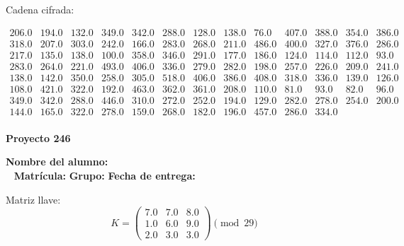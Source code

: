 \documentclass[12pt]{article}
\begin{document}
Cadena cifrada:
\begin{center}
$\begin{array}{lllllllllllll}
206.0 & 194.0 & 132.0 & 349.0 & 342.0 & 288.0 & 128.0 & 138.0 & 76.0 & 407.0 & 388.0 & 354.0 & 386.0\\
318.0 & 207.0 & 303.0 & 242.0 & 166.0 & 283.0 & 268.0 & 211.0 & 486.0 & 400.0 & 327.0 & 376.0 & 286.0\\
217.0 & 135.0 & 138.0 & 100.0 & 358.0 & 346.0 & 291.0 & 177.0 & 186.0 & 124.0 & 114.0 & 112.0 & 93.0\\
283.0 & 264.0 & 221.0 & 493.0 & 406.0 & 336.0 & 279.0 & 282.0 & 198.0 & 257.0 & 226.0 & 209.0 & 241.0\\
138.0 & 142.0 & 350.0 & 258.0 & 305.0 & 518.0 & 406.0 & 386.0 & 408.0 & 318.0 & 336.0 & 139.0 & 126.0\\
108.0 & 421.0 & 322.0 & 192.0 & 463.0 & 362.0 & 361.0 & 208.0 & 110.0 & 81.0 & 93.0 & 82.0 & 96.0\\
349.0 & 342.0 & 288.0 & 446.0 & 310.0 & 272.0 & 252.0 & 194.0 & 129.0 & 282.0 & 278.0 & 254.0 & 200.0\\
144.0 & 165.0 & 322.0 & 278.0 & 159.0 & 268.0 & 182.0 & 196.0 & 457.0 & 286.0 & 334.0\\
\end{array}$
\end{center}

\newpage


\textbf{Proyecto 246}

\textbf{Nombre del alumno:} \underline{\hspace{13cm}}\\\
\vspace{1cm}
\textbf{Matrícula:} \underline{\hspace{4cm}} \hspace{1cm}
\textbf{Grupo:} \underline{\hspace{2cm}}
\textbf{Fecha de entrega:} \underline{\hspace{2cm}}

\medskip

Matriz llave:
\[
K = \begin{pmatrix}
7.0 & 7.0 & 8.0\\
1.0 & 6.0 & 9.0\\
2.0 & 3.0 & 3.0
\end{pmatrix} \pmod{29}
\]
\end{document}
